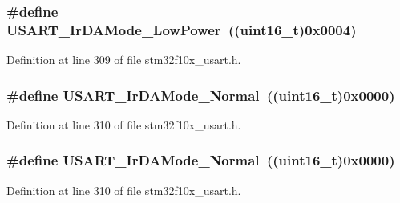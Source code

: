 \subsubsection[{\texorpdfstring{U\+S\+A\+R\+T\+\_\+\+Ir\+D\+A\+Mode\+\_\+\+Low\+Power}{USART_IrDAMode_LowPower}}]{\setlength{\rightskip}{0pt plus 5cm}\#define U\+S\+A\+R\+T\+\_\+\+Ir\+D\+A\+Mode\+\_\+\+Low\+Power~(({\bf uint16\+\_\+t})0x0004)}\hypertarget{group___u_s_a_r_t___ir_d_a___low___power_ga00c2635d0e6ca1a5b158f1c1673e862f}{}\label{group___u_s_a_r_t___ir_d_a___low___power_ga00c2635d0e6ca1a5b158f1c1673e862f}


Definition at line 309 of file stm32f10x\+\_\+usart.\+h.

\subsubsection[{\texorpdfstring{U\+S\+A\+R\+T\+\_\+\+Ir\+D\+A\+Mode\+\_\+\+Normal}{USART_IrDAMode_Normal}}]{\setlength{\rightskip}{0pt plus 5cm}\#define U\+S\+A\+R\+T\+\_\+\+Ir\+D\+A\+Mode\+\_\+\+Normal~(({\bf uint16\+\_\+t})0x0000)}\hypertarget{group___u_s_a_r_t___ir_d_a___low___power_ga796cd5451deb896741206986bd6d03e6}{}\label{group___u_s_a_r_t___ir_d_a___low___power_ga796cd5451deb896741206986bd6d03e6}


Definition at line 310 of file stm32f10x\+\_\+usart.\+h.

\subsubsection[{\texorpdfstring{U\+S\+A\+R\+T\+\_\+\+Ir\+D\+A\+Mode\+\_\+\+Normal}{USART_IrDAMode_Normal}}]{\setlength{\rightskip}{0pt plus 5cm}\#define U\+S\+A\+R\+T\+\_\+\+Ir\+D\+A\+Mode\+\_\+\+Normal~(({\bf uint16\+\_\+t})0x0000)}\hypertarget{group___u_s_a_r_t___ir_d_a___low___power_ga796cd5451deb896741206986bd6d03e6}{}\label{group___u_s_a_r_t___ir_d_a___low___power_ga796cd5451deb896741206986bd6d03e6}


Definition at line 310 of file stm32f10x\+\_\+usart.\+h.

